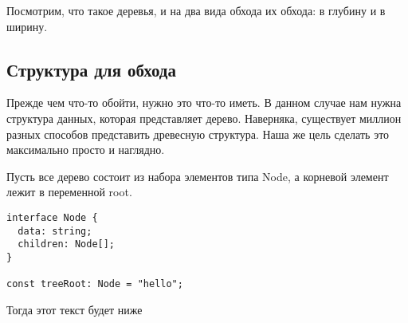 \documentclass[../article.tex]{subfiles}
\begin{document}
{Посмотрим, что такое деревья, и на два вида обхода их обхода: в глубину и в ширину.}

\subsection{Структура для обхода}

Прежде чем что-то обойти, нужно это что-то иметь. В данном случае нам нужна структура данных, которая представляет дерево. Наверняка, существует миллион разных способов представить древесную структура. Наша же цель сделать это максимально просто и наглядно.


Пусть все дерево состоит из набора элементов типа {\firacodebold Node}, а корневой элемент лежит в переменной {\firacodebold root}.
\begin{strip}
  \begin{ruledtitle}
    {
        \begin{lstlisting}
interface Node {
  data: string;
  children: Node[];
}

const treeRoot: Node = "hello";
        \end{lstlisting}
    }
    \end{ruledtitle}
\end{strip}

Тогда этот текст будет ниже
\end{document}
